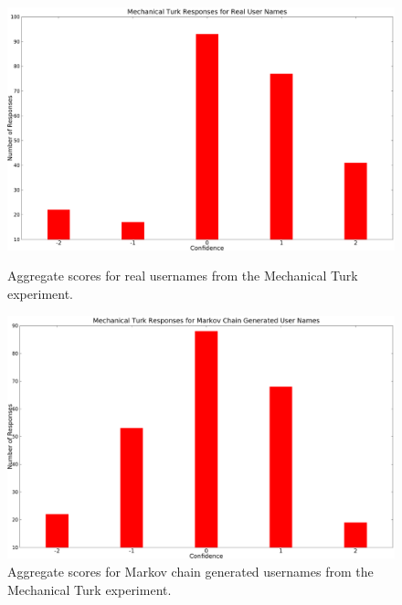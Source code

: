 \begin{figure}
\begin{minipage}{0.3\textwidth}
        \centering
    \centering
    \includegraphics[width=\columnwidth]{real-mturk-agg.eps}
    \caption{Aggregate scores for real usernames from the Mechanical Turk experiment.}
    \label{fig:evaluation:usernames:real-mturk-agg}
\end{minipage}%
\hspace{5mm}
\begin{minipage}{0.3\textwidth}
        \centering
					\includegraphics[width=\columnwidth]{Markov-mturk-agg.eps}
    \caption{Aggregate scores for Markov chain generated usernames from the Mechanical Turk experiment.}
    \label{fig:evaluation:usernames:Markov-mturk-agg}
\end{minipage}%
\hspace{5mm}
\begin{minipage}{0.3\textwidth}
        \centering

\end{minipage}
\end{figure}
